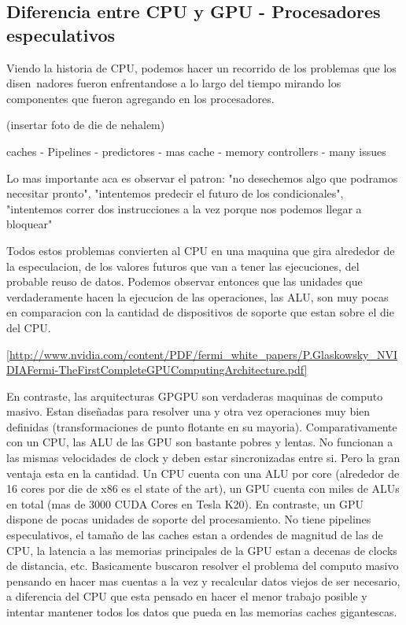 \subsection{Diferencia entre CPU y GPU - Procesadores especulativos}
Viendo la historia de CPU, podemos hacer un recorrido de los problemas que los disen~nadores fueron
enfrentandose a lo largo del tiempo mirando los componentes que fueron agregando en los procesadores.

(insertar foto de die de nehalem)

caches - Pipelines - predictores - mas cache - memory controllers - many issues

Lo mas importante aca es observar el patron: "no desechemos algo que podramos necesitar pronto", 
"intentemos predecir el futuro de los condicionales", "intentemos correr dos instrucciones a la vez 
porque nos podemos llegar a bloquear"

Todos estos problemas convierten al CPU en una maquina que gira alrededor de la especulacion, 
de los valores futuros que van a tener las ejecuciones, del probable reuso de datos.
Podemos observar entonces que las unidades que verdaderamente hacen la ejecucion de las operaciones,
las ALU, son muy pocas en comparacion con la cantidad de dispositivos de soporte que estan
sobre el die del CPU. 

\ref{http://www.nvidia.com/content/PDF/fermi_white_papers/P.Glaskowsky_NVIDIAFermi-TheFirstCompleteGPUComputingArchitecture.pdf}

En contraste, las arquitecturas GPGPU son verdaderas maquinas de computo masivo. Estan dise\~nadas para
resolver una y otra vez operaciones muy bien definidas (transformaciones de punto flotante en su mayoria).
Comparativamente con un CPU, las ALU de las GPU son bastante pobres y lentas. No funcionan a las mismas 
velocidades de clock y deben estar sincronizadas entre si. Pero la gran ventaja esta en la cantidad. 
Un CPU cuenta con una ALU por core (alrededor de 16 cores por die de x86 es el state of the art), un GPU 
cuenta con miles de ALUs en total (mas de 3000 CUDA Cores en Tesla K20). En contraste, un GPU dispone 
de pocas unidades de soporte del procesamiento. No tiene pipelines especulativos, el tama\~no de las caches
estan a ordendes de magnitud de las de CPU, la latencia a las memorias principales de la GPU estan a 
decenas de clocks de distancia, etc. Basicamente buscaron resolver el problema del computo masivo pensando
en hacer mas cuentas a la vez y recalcular datos viejos de ser necesario, a diferencia del CPU que esta
pensado en hacer el menor trabajo posible y intentar mantener todos los datos que pueda en las memorias caches
gigantescas.
 

